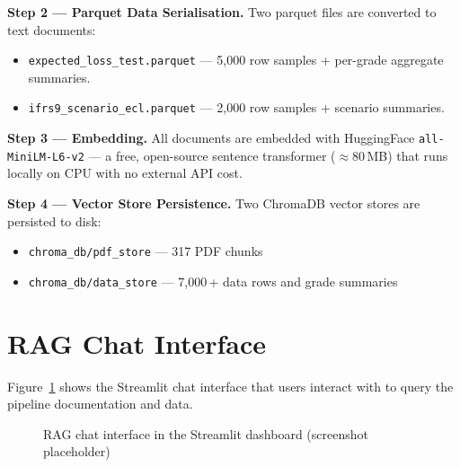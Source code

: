 \documentclass[12pt,a4paper]{report}
\begin{document}
\textbf{Step 2 --- Parquet Data Serialisation.}
Two parquet files are converted to text documents:
\begin{itemize}
  \item \texttt{expected\_loss\_test.parquet} --- 5,000 row samples + per-grade aggregate summaries.
  \item \texttt{ifrs9\_scenario\_ecl.parquet} --- 2,000 row samples + scenario summaries.
\end{itemize}

\textbf{Step 3 --- Embedding.}
All documents are embedded with HuggingFace \texttt{all-MiniLM-L6-v2} --- a free, open-source sentence transformer ($\approx$80\,MB) that runs locally on CPU with no external API cost.

\textbf{Step 4 --- Vector Store Persistence.}
Two ChromaDB vector stores are persisted to disk:
\begin{itemize}
  \item \texttt{chroma\_db/pdf\_store} --- 317 PDF chunks
  \item \texttt{chroma\_db/data\_store} --- 7,000\,+ data rows and grade summaries
\end{itemize}

\section{RAG Chat Interface}

Figure~\ref{fig:rag_chat} shows the Streamlit chat interface that users interact with to query the pipeline documentation and data.

\begin{figure}[H]
\centering
{}
\caption{RAG chat interface in the Streamlit dashboard (screenshot placeholder)}
\label{fig:rag_chat}
\end{figure}
\end{document}
